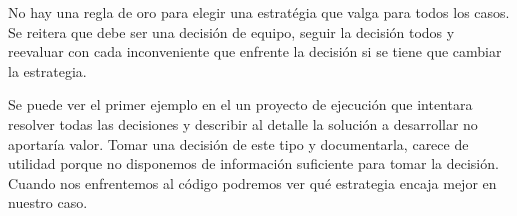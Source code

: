 No hay una regla de oro para elegir una estratégia que valga para todos los casos. Se reitera que debe ser una decisión de equipo, seguir la decisión todos y reevaluar con cada inconveniente que enfrente la decisión si se tiene que cambiar la estrategia.

Se puede ver el primer ejemplo en el un proyecto de ejecución que intentara resolver todas las decisiones y describir al detalle la solución a desarrollar no aportaría valor. Tomar una decisión de este tipo y documentarla, carece de utilidad porque no disponemos de información suficiente para tomar la decisión. Cuando nos enfrentemos al código podremos ver qué estrategia encaja mejor en nuestro caso.